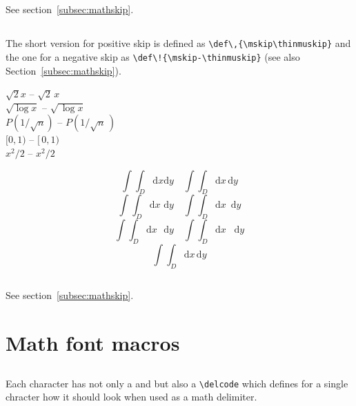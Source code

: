 \begin{table}[htb]
\subsection{}
See section~\ref{subsec:mathskip}.

\subsection{}
The short version for positive skip is defined as \verb+\def\,{\mskip\thinmuskip}+ and the one
for a negative skip as \verb+\def\!{\mskip-\thinmuskip}+ (see also Section~\ref{subsec:mathskip}).


\begin{LTXexample}[width=0.35\linewidth]
$\sqrt 2 x$ -- $\sqrt 2\,x$\\
$\sqrt{\log x}$ -- $\sqrt{\,\log x}$\\
$P\left({1/\sqrt n}\right)$ -- $P\left({1/ \sqrt n}\,\right)$\\[8pt]
 $[0,1)$ -- $[\,0,1)$\\
$x^2/2$ -- $x^2\!/2$\\
\end{LTXexample}

\begin{LTXexample}[width=0.35\linewidth]
\[\int\int_D \mathrm{d}x\mathrm{d}y \quad 
  \int\!\int_D \mathrm{d}x\,\mathrm{d}y\]
\[\int\!\!\int_D \mathrm{d}x\,\,\mathrm{d}y \quad 
  \int\!\!\!\int_D \mathrm{d}x\,\,\,\mathrm{d}y\]
\[\int\!\!\!\!\int_D \mathrm{d}x\,\,\,\,\mathrm{d}y \quad 
  \int\!\!\!\!\!\int_D \mathrm{d}x\,\,\,\,\,\mathrm{d}y\]
\[\int\!\!\!\int_D \mathrm{d}x\,\mathrm{d}y\]
\end{LTXexample}

\subsection{}
See section~\ref{subsec:mathskip}.


\section{Math font macros}
\subsection{}
Each character has not only a  and  but also 
a \verb+\delcode+
which defines for a single chracter how it should look when used as a math delimiter.


\end{table}
